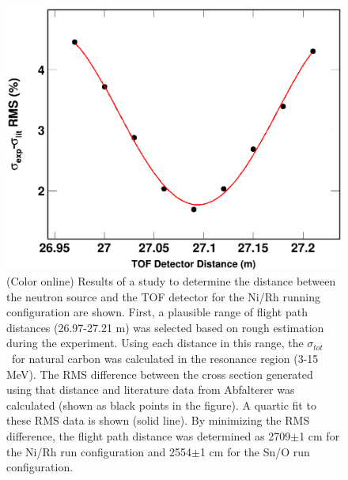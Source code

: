 \documentclass[twocolumn,secnumarabic,amssymb, nobibnotes, aps, prl,
superscriptaddress, nobalancelastpage]{revtex4}
\newcommand{\tot}{\ensuremath{\sigma_{tot}}}
\begin{document}
\begin{figure}
    \includegraphics[scale=0.3]{figures/DistanceStudyNi.png}
    \caption{(Color online) Results of a study to determine the distance between
    the neutron source and the TOF detector for the Ni/Rh running configuration
are shown. First, a plausible range of flight path distances (26.97-27.21 m) was
selected based on rough estimation during the experiment. Using each
distance in this range, the \tot\ for natural carbon was calculated in the
resonance region (3-15 MeV). The RMS difference between the cross section
generated using that distance and literature data from Abfalterer
\cite{Abfalterer2000, Abfalterer2001} was calculated (shown as black points in
the figure). A quartic fit to these RMS data is shown (solid line). By minimizing the
RMS difference, the flight path distance was determined as 2709$\pm$1 cm for the
Ni/Rh run configuration and 2554$\pm$1 cm for the Sn/O run configuration.}
    \label{DistanceStudy}
\end{figure}
\end{document}
